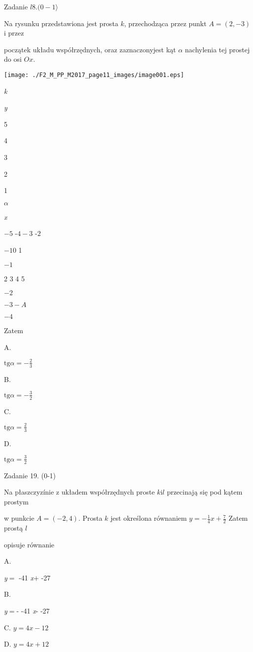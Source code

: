 \documentclass[a4paper,12pt]{article}
\begin{document}
Zadanie $l8. (0-1\rangle$

Na rysunku przedstawiona jest prosta $k$, przechodząca przez punkt $A=(2,-3)$ i przez

początek układu współrzędnych, oraz zaznaczonyjest kąt $\alpha$ nachylenia tej prostej do osi $Ox.$
\begin{center}
\texttt{[image: ./F2\_M\_PP\_M2017\_page11\_images/image001.eps]}
\end{center}
{\it k}

{\it y}

5

4

3

2

1

$\alpha$

{\it x}

$-5$ -$4  -3$ -$2$

$-1 0$ 1

$-1$

2 3  4 5

$-2$

$-3  -A$

$-4$

Zatem

A.

$\displaystyle \mathrm{t}\mathrm{g}\alpha=-\frac{2}{3}$

B.

$\displaystyle \mathrm{t}\mathrm{g}\alpha=-\frac{3}{2}$

C.

$\displaystyle \mathrm{t}\mathrm{g}\alpha=\frac{2}{3}$

D.

$\displaystyle \mathrm{t}\mathrm{g}\alpha=\frac{3}{2}$

Zadanie 19. (0-1)

Na płaszczyzínie z układem współrzędnych proste $k\mathrm{i} l$ przecinają się pod kątem prostym

w punkcie $A=(-2,4)$. Prosta $k$ jest określona równaniem $y=-\displaystyle \frac{1}{4}x+\frac{7}{2}$ Zatem prostą $l$

opisuje równanie

A.

{\it y}$=$ -41 {\it x}$+$ -27

B.

{\it y}$=$- -41 {\it x}- -27

C. $y=4x-12$

D. $y=4x+12$
\end{document}
